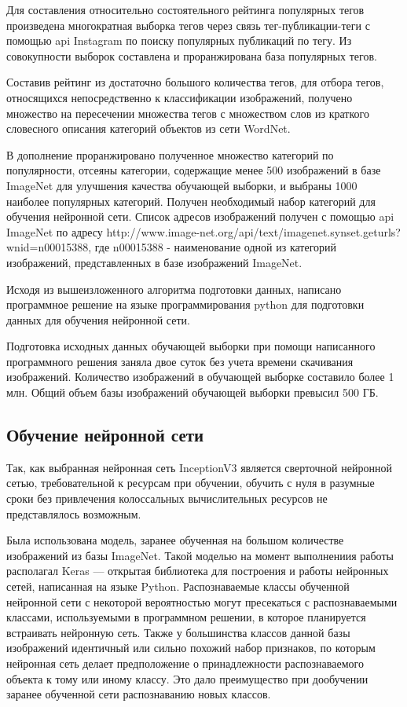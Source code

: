 Для составления относительно состоятельного рейтинга популярных тегов произведена многократная выборка тегов через связь тег-публикации-теги с помощью api Instagram по поиску популярных публикаций по тегу. 
Из совокупности выборок составлена и проранжирована база популярных тегов.


Составив рейтинг из достаточно большого количества тегов, для отбора тегов, относящихся непосредственно к классификации изображений, получено множество на пересечении множества тегов с множеством слов из краткого словесного описания категорий объектов из сети WordNet. 


В дополнение проранжировано полученное множество категорий по популярности, отсеяны категории, содержащие менее 500 изображений в базе ImageNet для улучшения качества обучающей выборки, и выбраны 1000 наиболее популярных категорий. 
Получен необходимый набор категорий для обучения нейронной сети. 
Список адресов изображений получен с помощью api ImageNet по адресу http://www.image-net.org/api/text/imagenet.synset.geturls?wnid=n00015388, где n00015388 - наименование одной из категорий изображений, представленных в базе изображений ImageNet.

Исходя из вышеизложенного алгоритма подготовки данных, написано программное решение на языке программирования python для подготовки данных для обучения нейронной сети.

Подготовка исходных данных обучающей выборки при помощи написанного программного решения заняла двое суток без учета времени скачивания изображений. 
Количество изображений в обучающей выборке составило более 1 млн. 
Общий объем базы изображений обучающей выборки превысил 500 ГБ.

\subsection{Обучение нейронной сети}

Так, как выбранная нейронная сеть InceptionV3 является сверточной нейронной сетью, требовательной к ресурсам при обучении, обучить с нуля в разумные сроки без привлечения колоссальных вычислительных ресурсов не представлялось возможным.

Была использована модель, заранее обученная на большом количестве изображений из базы ImageNet. 
Такой моделью на момент выполнениия работы располагал Keras — открытая библиотека для построения и работы нейронных сетей, написанная на языке Python. 
Распознаваемые классы обученной нейронной сети с некоторой вероятностью могут пресекаться с распознаваемыми классами, используемыми в программном решении, в которое планируется встраивать нейронную сеть. 
Также у большинства классов данной базы изображений идентичный или сильно похожий набор признаков, по которым нейронная сеть делает предположение о принадлежности распознаваемого объекта к тому или иному классу. 
Это дало преимущество при дообучении заранее обученной сети распознаванию новых классов.

